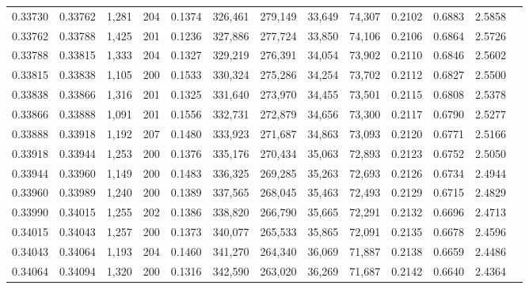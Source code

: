 \begin{tabular}{rrrrrrrrrrrrr}
0.33730 & 0.33762 & 1,281 & 204 &                                     0.1374 & 326,461 & 279,149 &  33,649 &  74,307 & 0.2102 & 0.6883 & 2.5858 \\
0.33762 & 0.33788 & 1,425 & 201 &                                     0.1236 & 327,886 & 277,724 &  33,850 &  74,106 & 0.2106 & 0.6864 & 2.5726 \\
0.33788 & 0.33815 & 1,333 & 204 &                                     0.1327 & 329,219 & 276,391 &  34,054 &  73,902 & 0.2110 & 0.6846 & 2.5602 \\
0.33815 & 0.33838 & 1,105 & 200 &                                     0.1533 & 330,324 & 275,286 &  34,254 &  73,702 & 0.2112 & 0.6827 & 2.5500 \\
0.33838 & 0.33866 & 1,316 & 201 &                                     0.1325 & 331,640 & 273,970 &  34,455 &  73,501 & 0.2115 & 0.6808 & 2.5378 \\
0.33866 & 0.33888 & 1,091 & 201 &                                     0.1556 & 332,731 & 272,879 &  34,656 &  73,300 & 0.2117 & 0.6790 & 2.5277 \\
0.33888 & 0.33918 & 1,192 & 207 &                                     0.1480 & 333,923 & 271,687 &  34,863 &  73,093 & 0.2120 & 0.6771 & 2.5166 \\
0.33918 & 0.33944 & 1,253 & 200 &                                     0.1376 & 335,176 & 270,434 &  35,063 &  72,893 & 0.2123 & 0.6752 & 2.5050 \\
0.33944 & 0.33960 & 1,149 & 200 &                                     0.1483 & 336,325 & 269,285 &  35,263 &  72,693 & 0.2126 & 0.6734 & 2.4944 \\
0.33960 & 0.33989 & 1,240 & 200 &                                     0.1389 & 337,565 & 268,045 &  35,463 &  72,493 & 0.2129 & 0.6715 & 2.4829 \\
0.33990 & 0.34015 & 1,255 & 202 &                                     0.1386 & 338,820 & 266,790 &  35,665 &  72,291 & 0.2132 & 0.6696 & 2.4713 \\
0.34015 & 0.34043 & 1,257 & 200 &                                     0.1373 & 340,077 & 265,533 &  35,865 &  72,091 & 0.2135 & 0.6678 & 2.4596 \\
0.34043 & 0.34064 & 1,193 & 204 &                                     0.1460 & 341,270 & 264,340 &  36,069 &  71,887 & 0.2138 & 0.6659 & 2.4486 \\
0.34064 & 0.34094 & 1,320 & 200 &                                     0.1316 & 342,590 & 263,020 &  36,269 &  71,687 & 0.2142 & 0.6640 & 2.4364 \\

\end{tabular}
